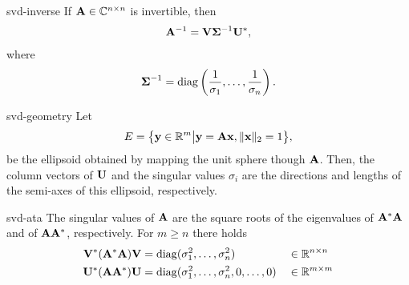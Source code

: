 \begin{Corollary}{svd-inverse}
  If $\mathbf A\in\mathbb C^{n\times n}$ is invertible, then
  \begin{gather}
    \mathbf A^{-1} = \mathbf V\boldsymbol\Sigma^{-1}\mathbf U^*,
  \end{gather}
  where
  \begin{gather}
    \boldsymbol\Sigma^{-1} = \operatorname{diag}\left(\frac1{\sigma_1},\dots,\frac1{\sigma_n}\right).
  \end{gather}
\end{Corollary}

\begin{Remark}{svd-geometry}
  Let
  \begin{gather}
    E = \bigl\{ \mathbf y\in \mathbb R^m \big| \mathbf y=\mathbf A\mathbf x, \lVert\mathbf x\rVert_2 = 1 \bigr\},
  \end{gather}
  be the ellipsoid obtained by mapping the unit sphere though
  $\mathbf A$. Then, the column vectors of $\mathbf U$ and the singular values
  $\sigma_i$ are the directions and lengths of the semi-axes of this
  ellipsoid, respectively.
\end{Remark}

\begin{Lemma}{svd-ata}
  The singular values of $\mathbf A$ are the square roots of the
  eigenvalues of $\mathbf A^*\mathbf A$ and of $\mathbf A\mathbf A^*$, respectively. For $m\ge n$ there holds
  \begin{align}
    \mathbf V^*(\mathbf A^*\mathbf A)\mathbf V &= \operatorname{diag}(\sigma_1^2,\dots,\sigma_n^2)
    &&\in \mathbb R^{n\times n}\\
    \mathbf U^*(\mathbf A\mathbf A^*)\mathbf U &= \operatorname{diag}(\sigma_1^2,\dots,\sigma_n^2, 0,\dots,0)
    &&\in \mathbb R^{m\times m}
  \end{align}
\end{Lemma}

